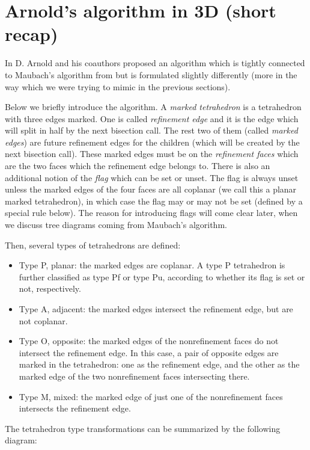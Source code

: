 \documentclass[a4paper,12pt]{amsart}
\numberwithin{equation}{section}
\begin{document}
\section{Arnold's algorithm in 3D (short recap)}

In \cite{arnold} D. Arnold and his coauthors proposed an algorithm which is tightly connected to Maubach's algorithm from \cite{maubach} but is formulated slightly differently (more in the way which we were trying to mimic in the previous sections).

Below we briefly introduce the algorithm. 
A \textit{marked tetrahedron} is a tetrahedron with three edges marked. One is called \textit{refinement edge} and it is the edge which will split in half by the next bisection call. The rest two of them (called \textit{marked edges}) are future refinement edges for the children (which will be created by the next bisection call). These marked edges must be on the \textit{refinement faces} which are the two faces which the refinement edge belongs to. There is also an additional notion of the \textit{flag} which can be set or unset. The flag is always unset unless the marked edges of the
four faces are all coplanar (we call this a planar marked tetrahedron), in which case
the flag may or may not be set (defined by a special rule below). The reason for introducing flags will come clear later, when we discuss tree diagrams coming from Maubach's algorithm.

Then, several types of tetrahedrons are defined:
\begin{itemize}
\item  Type P, planar: the marked edges are coplanar. A type P tetrahedron is further 		classified as type Pf or type Pu, according to whether its flag is set or not, 			respectively.
\item Type A, adjacent: the marked edges intersect the refinement edge, but are
	not coplanar.
\item Type O, opposite: the marked edges of the nonrefinement faces do not intersect 		the refinement edge. In this case, a pair of opposite edges are marked in the 			tetrahedron: one as the refinement edge, and the other as the marked edge of the 		two nonrefinement faces intersecting there.
\item Type M, mixed: the marked edge of just one of the nonrefinement faces
	intersects the refinement edge.
\end{itemize}

The tetrahedron type transformations can be summarized by the following diagram:
\end{document}
